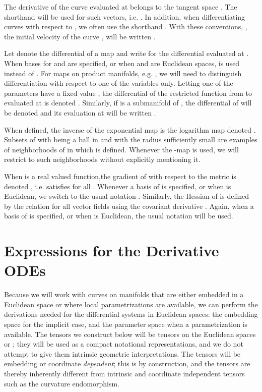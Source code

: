 \documentclass[final]{svjour3}
\begin{document}
The derivative  of the curve 
evaluated at  belongs to the tangent space .
The shorthand  will be used for such vectors, i.e.
. In addition, when differentiating curves with
respect to , we often use the shorthand . With these conventions,
, the initial velocity of the curve , will be written
.

Let  denote the differential of a map  and write  for
the differential evaluated at . When bases 
for  and  are specified, or when  and  are Euclidean spaces, 
 is used instead of .
For maps on product manifolds, e.g. , we will need to distinguish differentiation with respect
to one of the variables only. Letting one of the parameters have a fixed value
, the differential of the restricted function  from 
to 
evaluated at  is denoted . Similarly, if  is a submanifold of , the differential
of  will be denoted  and its evaluation at  will
be written .

When defined, the inverse of the exponential map  is the
logarithm map denoted . Subsets  of  with
 being a ball in  and with the radius  sufficiently small
are examples of neighborhoods of  in which 
 is defined. Whenever the -map is used, 
we will restrict to such neighborhoods without explicitly mentioning it.

When  is a real valued function,the
gradient of  with respect to the metric is denoted , i.e. 
 satisfies  for all . Whenever a basis of  is specified, or when  is Euclidean, we switch 
to the usual notation . Similarly, the Hessian of
 is defined by the relation  for all
vector fields  using the covariant derivative . Again, when a basis of  is specified, or when  is
Euclidean, the usual notation  will be used. 


\section{Expressions for the Derivative ODEs}
\label{app:A}
Because we will work with curves on manifolds that are either embedded in a
Euclidean space or where local parametrizations are available, we can perform
the derivations needed for the differential systems in Euclidean
spaces: the embedding space  for the implicit case, and the parameter
space  when a parametrization  is
available. The tensors we construct below will be tensors on the Euclidean
spaces  or
; they will be used as a compact notational representations,
and we do not attempt to give them intrinsic geometric
interpretations. The tensors will be embedding or coordinate \emph{dependent}; this is
by construction, and the tensors are thereby inherently different from
intrinsic and coordinate independent tensors such as the curvature endomorphism.
\end{document}
